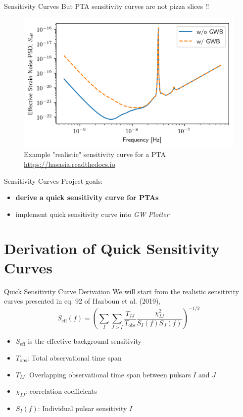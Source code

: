 \documentclass{beamer}
\begin{document}
\begin{frame}{Sensitivity Curves}
    But PTA sensitivity curves are not pizza slices !!
    \begin{figure}
        \centering
        \includegraphics[width=\linewidth]{figs/example_sensitivity_curve.png}
        \caption{Example "realistic" sensitivity curve for a PTA
        \centering \url{https://hasasia.readthedocs.io}
        }
        \label{fig:pta_sensitivity_curve}
    \end{figure}
\end{frame}

\begin{frame}{Sensitivity Curves}
    Project goals:
    \begin{itemize}
        \item \textbf{derive a quick sensitivity curve for PTAs}
        \item implement quick sensitivity curve into \textit{GW Plotter}
    \end{itemize}
\end{frame}

\section{Derivation of Quick Sensitivity Curves}

\begin{frame}{Quick Sensitivity Curve Derivation}
    We will start from the realistic sensitivity curves presented in eq. 92 of Hazboun et al. (2019),
    \[
    S_{\text{eff}}(f) = \left( \sum_I \sum_{J > I} \frac{T_{IJ}}{T_{\text{obs}}} \frac{\chi_{IJ}^2}{S_I(f) S_J(f)} \right)^{-1/2}
    \]
    \begin{itemize}
        \item $S_{\text{eff}}$ is the effective background sensitivity
        \item $T_{\text{obs}}$: Total observational time span
        \item $T_{IJ}$: Overlapping observational time span between pulsars $I$ and $J$
        \item $\chi_{IJ}$: correlation coefficients
        \item $S_I(f)$: Individual pulsar sensitivity $I$
    \end{itemize}
\end{frame}
\end{document}
